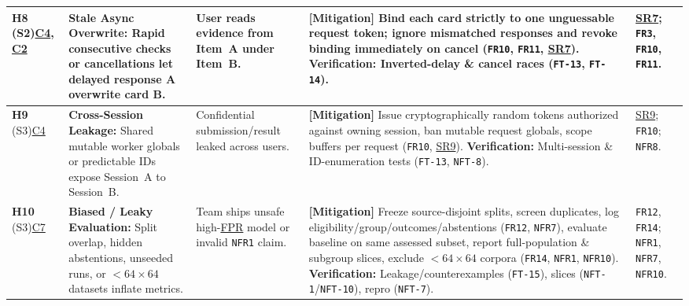 \documentclass[11pt]{article}
\newcommand{\FPR}{\hyperlink{ha-acr-fpr}{FPR}}
\begin{document}
\begin{landscape}
\begin{tabularx}{\linewidth}{P{1.75cm} P{3.2cm} P{2.9cm} Y P{2.25cm}}
\label{haz:H8}\textbf{H8} (S2)\newline \hyperref[comp:C4]{C4}, \hyperref[comp:C2]{C2} &
\textbf{Stale Async Overwrite:} Rapid consecutive checks or cancellations let delayed response A overwrite card B. &
User reads evidence from Item~A under Item~B. &
\textbf{[Mitigation]} Bind each card strictly to one unguessable request token; ignore mismatched responses and revoke binding immediately on cancel (\texttt{FR10}, \texttt{FR11}, \hyperref[SR7]{SR7}).\newline
\textbf{Verification:} Inverted-delay \& cancel races (\texttt{FT-13}, \texttt{FT-14}). &
\hyperref[SR7]{SR7}; \texttt{FR3}, \texttt{FR10}, \texttt{FR11}.\\
\midrule

\label{haz:H9}\textbf{H9} (S3)\newline \hyperref[comp:C4]{C4} &
\textbf{Cross-Session Leakage:} Shared mutable worker globals or predictable IDs expose Session~A to Session~B. &
Confidential submission/result leaked across users. &
\textbf{[Mitigation]} Issue cryptographically random tokens authorized against owning session, ban mutable request globals, scope buffers per request (\texttt{FR10}, \hyperref[SR9]{SR9}).\newline
\textbf{Verification:} Multi-session \& ID-enumeration tests (\texttt{FT-13}, \texttt{NFT-8}). &
\hyperref[SR9]{SR9}; \texttt{FR10}; \texttt{NFR8}.\\
\midrule

\label{haz:H10}\textbf{H10} (S3)\newline \hyperref[comp:C7]{C7} &
\textbf{Biased / Leaky Evaluation:} Split overlap, hidden abstentions, unseeded runs, or $<64\times64$ datasets inflate metrics. &
Team ships unsafe high-\FPR{} model or invalid \texttt{NFR1} claim. &
\textbf{[Mitigation]} Freeze source-disjoint splits, screen duplicates, log eligibility/group/outcomes/abstentions (\texttt{FR12}, \texttt{NFR7}), evaluate baseline on same assessed subset, report full-population \& subgroup slices, exclude $<64\times64$ corpora (\texttt{FR14}, \texttt{NFR1}, \texttt{NFR10}).\newline
\textbf{Verification:} Leakage/counterexamples (\texttt{FT-15}), slices (\texttt{NFT-1}/\texttt{NFT-10}), repro (\texttt{NFT-7}). &
\texttt{FR12}, \texttt{FR14}; \texttt{NFR1}, \texttt{NFR7}, \texttt{NFR10}.\\

\end{tabularx}
\renewcommand{\arraystretch}{1.0}
\setlength{\tabcolsep}{6pt}
\normalsize
\end{landscape}
\end{document}
